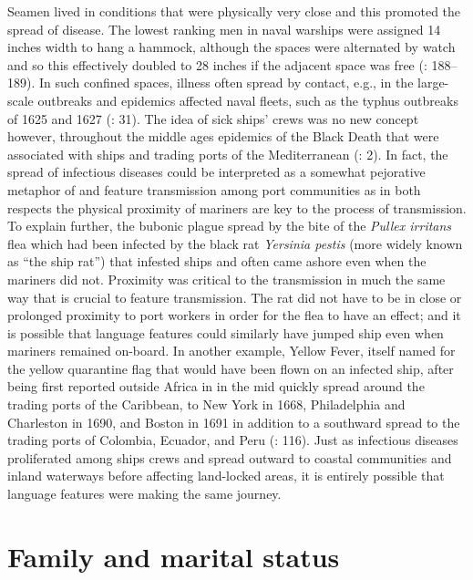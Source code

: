 Seamen lived in conditions that were physically very close and this promoted the spread of disease. The lowest ranking men in naval warships were assigned 14 inches width to hang a hammock, although the spaces were alternated by watch and so this effectively doubled to 28 inches if the adjacent space was free (\citealt{AdkinsAdkins2008}: 188–189). In such confined spaces, illness often spread by contact, e.g., in the  large-scale outbreaks and epidemics affected naval fleets, such as the typhus outbreaks of 1625 and 1627 (\citealt{Brown2011}: 31). The idea of sick ships’ crews was no new concept however, throughout the middle ages epidemics of the Black Death that were associated with ships and trading ports of the Mediterranean (\citealt{Brown2011}: 2). In fact, the spread of infectious diseases could be interpreted as a somewhat pejorative metaphor of  and feature transmission among port communities as in both respects the physical proximity of mariners are key to the process of transmission. To explain further, the bubonic plague spread by the bite of the \textit{Pullex irritans} flea which had been infected by the black rat \textit{Yersinia pestis} (more widely known as “the ship rat”) that infested  ships and often came ashore even when the mariners did not. Proximity was critical to the transmission in much the same way that  is crucial to feature transmission. The rat did not have to be in close or prolonged proximity to port workers in order for the flea to have an effect; and it is possible that language features could similarly have jumped ship even when mariners remained on-board. In another example, Yellow Fever, itself named for the yellow quarantine flag that would have been flown on an infected ship, after being first reported outside Africa in  in the mid  quickly spread around the trading ports of the Caribbean, to New York in 1668, Philadelphia and Charleston in 1690, and Boston in 1691 in addition to a southward spread to the trading ports of Colombia, Ecuador, and Peru (\citealt{Brown2011}: 116). Just as infectious diseases proliferated among ships crews and spread outward to coastal communities and inland waterways before affecting land-locked areas, it is entirely possible that language features were making the same journey. 

\section{{Family and marital status}}\label{sec:3.6}

